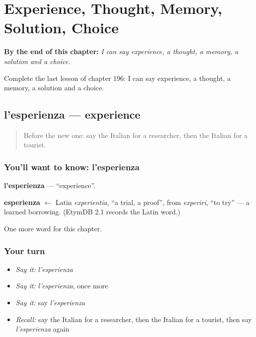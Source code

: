 
\chapter{Experience, Thought, Memory, Solution, Choice}
\label{ch:it-experience-thought-memory-solution-choice}

\begin{chapteropening}
\textbf{By the end of this chapter:} \emph{I can say experience, a thought, a memory, a solution and a choice.}

Complete the last lesson of chapter 196: I can say experience, a thought, a memory, a solution and a choice.
\end{chapteropening}

\section[l'esperienza]{l'esperienza — experience}

\label{lesson:IT-C196-esperienza}



\begin{quote}
Before the new one: say the Italian for a researcher, then the Italian for a tourist.
\end{quote}

\subsection*{You'll want to know: l'esperienza}
\textbf{l'esperienza} — \textquotedblleft{}experience\textquotedblright{}.

\begin{cousinweb}
\textbf{esperienza} $\leftarrow$ Latin \emph{experientia}, \textquotedblleft{}a trial, a proof\textquotedblright{}, from \emph{experiri}, \textquotedblleft{}to try\textquotedblright{} — a learned borrowing. (EtymDB 2.1 records the Latin word.)
\end{cousinweb}

\begin{grammarlens}[title={What you've built}]
One more word for this chapter.
\end{grammarlens}

\subsection*{Your turn}
\begin{itemize}
\raggedright
  \item \emph{Say it:} \emph{l'esperienza}
  \item \emph{Say it:} \emph{l'esperienza}, once more
  \item \emph{Say it:} say \emph{l'esperienza}
  \item \emph{Recall:} say the Italian for a researcher, then the Italian for a tourist, then say \emph{l'esperienza} again
\end{itemize}

